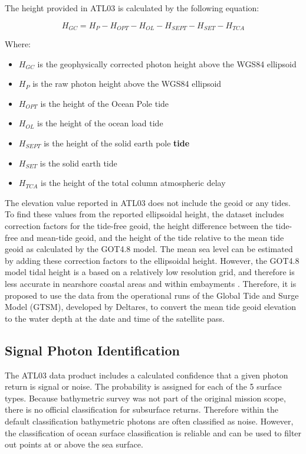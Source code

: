 The height provided in ATL03 is calculated by the following equation:

\[H_{GC} =  H_{P} - H_{OPT} - H_{OL} - H_{SEPT} - H_{SET} - H_{TCA}\]

Where:

\begin{itemize}

      \item \(H_{GC}\) is the geophysically corrected photon height above the WGS84 ellipsoid
      \item \(H_{P}\) is the raw photon height above the WGS84 ellipsoid
      \item \(H_{OPT}\) is the height of the Ocean Pole tide
      \item \(H_{OL}\) is the height of the ocean load tide
      \item \(H_{SEPT}\) is the height of the solid earth pole \textbf{tide}
      \item \(H_{SET}\) is the solid earth tide
      \item \(H_{TCA}\) is the height of the total column atmospheric delay
\end{itemize}

The elevation value reported in ATL03 does not include the geoid or any tides. To find these values from the reported ellipsoidal height, the dataset includes correction factors for the tide-free geoid, the height difference between the tide-free and mean-tide geoid, and the height of the tide relative to the mean tide geoid as calculated by the GOT4.8 model. The mean sea level can be estimated by adding these correction factors to the ellipsoidal height. However, the GOT4.8 model tidal height is a based on a relatively low resolution grid, and therefore is less accurate in nearshore coastal areas and within embayments \parencite{Neumann2019e}. Therefore, it is proposed to use the data from the operational runs of the Global Tide and Surge Model (GTSM), developed by Deltares, to convert the mean tide geoid elevation to the water depth at the date and time of the satellite pass.

\subsection{Signal Photon Identification}

The ATL03 data product includes a calculated confidence that a given photon return is signal or noise. The probability is assigned for each of the 5 surface types. Because bathymetric survey was not part of the original mission scope, there is no official classification for subsurface returns. Therefore within the default classification bathymetric photons are often classified as noise. However, the classification of ocean surface classification is reliable and can be used to filter out points at or above the sea surface.

